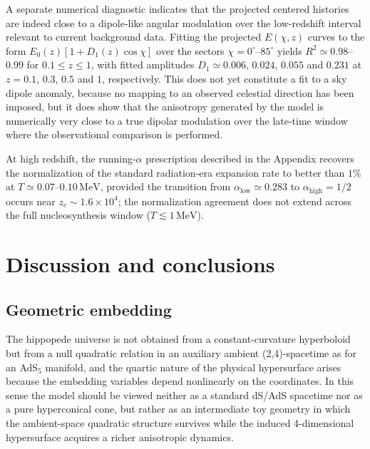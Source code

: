 \documentclass[3p,times,twocolumn]{elsarticle}
\begin{document}
A separate numerical diagnostic indicates that the projected centered histories are indeed close to a dipole-like angular modulation over the low-redshift interval relevant to current background data. Fitting the projected $E(\chi,z)$ curves to the form $E_0(z)[1+D_1(z)\cos\chi]$ over the sectors $\chi=0^\circ$--$85^\circ$ yields $R^2\simeq0.98$--$0.99$ for $0.1\le z\le1$, with fitted amplitudes $D_1\simeq0.006$, $0.024$, $0.055$ and $0.231$ at $z=0.1$, $0.3$, $0.5$ and $1$, respectively. This does not yet constitute a fit to a sky dipole anomaly, because no mapping to an observed celestial direction has been imposed, but it does show that the anisotropy generated by the model is numerically very close to a true dipolar modulation over the late-time window where the observational comparison is performed.

At high redshift, the running-$\alpha$ prescription described in the Appendix recovers the normalization of the standard radiation-era expansion rate to better than $1\%$ at $T\simeq0.07$--$0.10\,\mathrm{MeV}$, provided the transition from $\alpha_{\mathrm{low}}\simeq0.283$ to $\alpha_{\mathrm{high}}=1/2$ occurs near $z_c\sim1.6\times10^4$; the normalization agreement does not extend across the full nucleosynthesis window ($T\lesssim1\,\mathrm{MeV}$).

\section{Discussion and conclusions}\label{sec:discussion}

\subsection{Geometric embedding}

The hippopede universe is not obtained from a constant-curvature hyperboloid but from a null quadratic relation in an auxiliary ambient (2,4)-spacetime as for an AdS${}_5$ manifold, and the quartic nature of the physical hypersurface arises because the embedding variables depend nonlinearly on the coordinates. In this sense the model should be viewed neither as a standard dS/AdS spacetime nor as a pure hyperconical cone, but rather as an intermediate toy geometry in which the ambient-space quadratic structure survives while the induced 4-dimensional hypersurface acquires a richer anisotropic dynamics.
\end{document}
